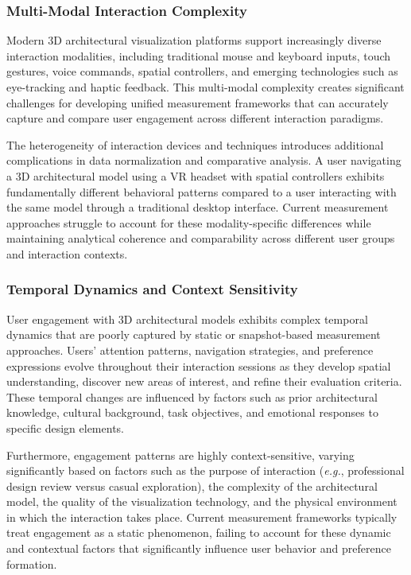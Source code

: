 \subsubsection{Multi-Modal Interaction Complexity}
\label{subsubsec:multimodal_complexity}

Modern 3D architectural visualization platforms support increasingly diverse interaction modalities, including traditional mouse and keyboard inputs, touch gestures, voice commands, spatial controllers, and emerging technologies such as eye-tracking and haptic feedback. This multi-modal complexity creates significant challenges for developing unified measurement frameworks that can accurately capture and compare user engagement across different interaction paradigms.

The heterogeneity of interaction devices and techniques introduces additional complications in data normalization and comparative analysis. A user navigating a 3D architectural model using a VR headset with spatial controllers exhibits fundamentally different behavioral patterns compared to a user interacting with the same model through a traditional desktop interface. Current measurement approaches struggle to account for these modality-specific differences while maintaining analytical coherence and comparability across different user groups and interaction contexts.

\subsubsection{Temporal Dynamics and Context Sensitivity}
\label{subsubsec:temporal_dynamics}

User engagement with 3D architectural models exhibits complex temporal dynamics that are poorly captured by static or snapshot-based measurement approaches. Users' attention patterns, navigation strategies, and preference expressions evolve throughout their interaction sessions as they develop spatial understanding, discover new areas of interest, and refine their evaluation criteria. These temporal changes are influenced by factors such as prior architectural knowledge, cultural background, task objectives, and emotional responses to specific design elements.

Furthermore, engagement patterns are highly context-sensitive, varying significantly based on factors such as the purpose of interaction (\textit{e.g.}, professional design review versus casual exploration), the complexity of the architectural model, the quality of the visualization technology, and the physical environment in which the interaction takes place. Current measurement frameworks typically treat engagement as a static phenomenon, failing to account for these dynamic and contextual factors that significantly influence user behavior and preference formation.

